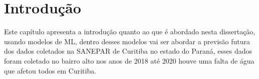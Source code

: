 

\section{Introdu{\c c}{\~a}o} \label{sec:int}

Este capítulo apresenta a introdução quanto ao que é abordado nesta dissertação, usando modelos de ML, dentro desses modelos vai ser abordar a previsão futura dos dados coletados na SANEPAR de Curitiba no estado do Paraná, esses dados foram coletado no bairro alto nos anos de 2018 até 2020 houve uma falta de água que afetou todos em Curitiba.




    
          
    
    
    
    
    
    
    
    